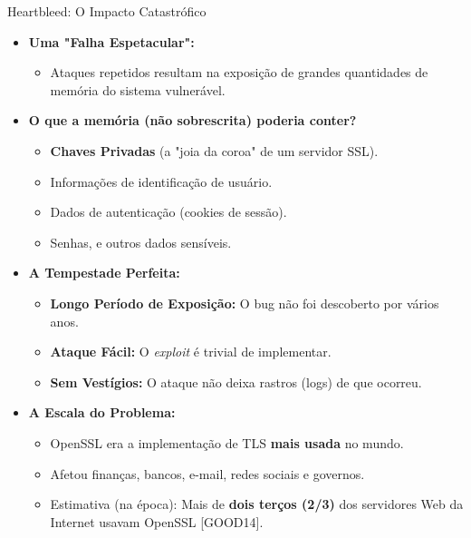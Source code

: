 \begin{frame}{Heartbleed: O Impacto Catastrófico}
    \begin{itemize}
        \item \textbf{Uma "Falha Espetacular":}
              \begin{itemize}
                  \item Ataques repetidos resultam na exposição de grandes quantidades de memória do sistema vulnerável.
              \end{itemize}

        \item \textbf{O que a memória (não sobrescrita) poderia conter?}
              \begin{itemize}
                  \item \textbf{Chaves Privadas} (a "joia da coroa" de um servidor SSL).
                  \item Informações de identificação de usuário.
                  \item Dados de autenticação (cookies de sessão).
                  \item Senhas, e outros dados sensíveis.
              \end{itemize}

        \item \textbf{A Tempestade Perfeita:}
              \begin{itemize}
                  \item \textbf{Longo Período de Exposição:} O bug não foi descoberto por vários anos.
                  \item \textbf{Ataque Fácil:} O \textit{exploit} é trivial de implementar.
                  \item \textbf{Sem Vestígios:} O ataque não deixa rastros (logs) de que ocorreu.
              \end{itemize}

        \item \textbf{A Escala do Problema:}
              \begin{itemize}
                  \item OpenSSL era a implementação de TLS \textbf{mais usada} no mundo.
                  \item Afetou finanças, bancos, e-mail, redes sociais e governos.
                  \item Estimativa (na época): Mais de \textbf{dois terços (2/3)} dos servidores Web da Internet usavam OpenSSL [GOOD14].
              \end{itemize}
    \end{itemize}
\end{frame}